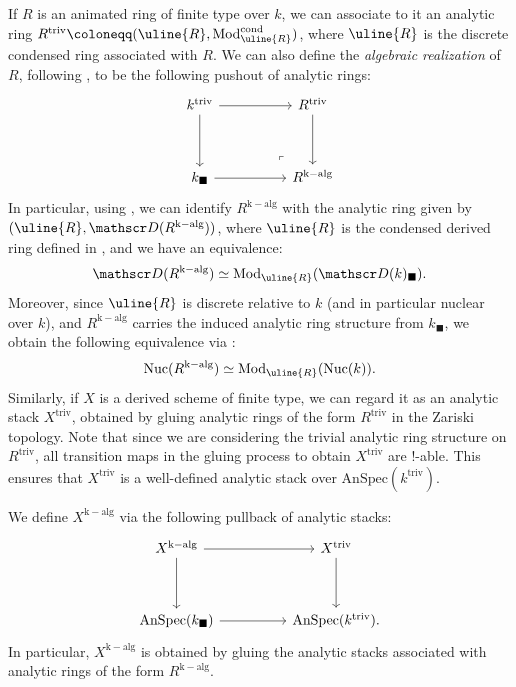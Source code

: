 \documentclass[oneside, hidelinks, 12pt, a4paper,reqno]{amsart}
\theoremstyle{plain}
\theoremstyle{definition}
\theoremstyle{plain}
\newcommand{\cD}{\mathscr D}
\newcommand{\Nuc}{\mathrm{Nuc}}
\newcommand{\Mod}{\mathrm{Mod}}
\newcommand{\Solid}{\blacksquare}
\begin{document}
If $R$ is an animated ring of finite type over $k$, we can associate to it an analytic ring $R^{\mathrm{triv}}\coloneqq (\uline{R}, \Mod_{\uline{R}}^{\mathrm{cond}})$, where $\uline{R}$ is the discrete condensed ring associated with $R$. We can also define the \emph{algebraic realization} of $R$, following \cite[Definition 3.2.1]{wang2026relativegagatheoremapplication}, to be the following pushout of analytic rings:
\[
\begin{tikzcd}
	{k^{\mathrm{triv}}} && {R^{\mathrm{triv}}} \\
	\\
	{k_{\Solid}} && {R^{\mathrm{k-alg}}}
	\arrow[from=1-1, to=1-3]
	\arrow[from=1-1, to=3-1]
	\arrow[from=1-3, to=3-3]
	\arrow[from=3-1, to=3-3]
	\arrow["\lrcorner"{anchor=center, pos=0.125, rotate=180}, draw=none, from=3-3, to=1-1]
\end{tikzcd}
\]
In particular, using \cite[Proposition 12.12]{analytic}, we can identify $R^{\mathrm{k-alg}}$ with the analytic ring given by $(\uline{R}, \cD(R^{\mathrm{k-alg}}))$, where $\uline{R}$ is the condensed derived ring defined in , and we have an equivalence: 
\[
\cD(R^{\mathrm{k-alg}}) \simeq \Mod_{\uline{R}}(\cD(k)_{\Solid}).
\]
Moreover, since $\uline{R}$ is discrete relative to $k$ (and in particular nuclear over $k$), and $R^{\mathrm{k-alg}}$ carries the induced analytic ring structure from $k_{\Solid}$, we obtain the following equivalence via \cite[Lemma 2.9]{mikami2023fppfdescentcondensedanimatedrings}:
\[
\Nuc(R^{\mathrm{k-alg}}) \simeq \Mod_{\uline{R}}(\Nuc(k)).
\]
Similarly, if $X$ is a derived scheme of finite type, we can regard it as an analytic stack $X^{\mathrm{triv}}$, obtained by gluing analytic rings of the form $R^{\mathrm{triv}}$ in the Zariski topology. Note that since we are considering the trivial analytic ring structure on $R^{\mathrm{triv}}$, all transition maps in the gluing process to obtain $X^{\mathrm{triv}}$ are !-able. This ensures that $X^{\mathrm{triv}}$ is a well-defined analytic stack over $\mathrm{AnSpec}(k^{\mathrm{triv}})$.

We define $X^{\mathrm{k-alg}}$ via the following pullback of analytic stacks:
\[
\begin{tikzcd}
	{X^{\mathrm{k-alg}}} && {X^{\mathrm{triv}}} \\
	\\
	{\mathrm{AnSpec}(k_{\Solid})} && {\mathrm{AnSpec}(k^{\mathrm{triv}}).}
	\arrow[from=1-1, to=1-3]
	\arrow[from=1-1, to=3-1]
	\arrow[from=1-3, to=3-3]
	\arrow[from=3-1, to=3-3]
\end{tikzcd}
\] 
In particular, $X^{\mathrm{k-alg}}$ is obtained by gluing the analytic stacks associated with analytic rings of the form $R^{\mathrm{k-alg}}$. 
\end{document}
